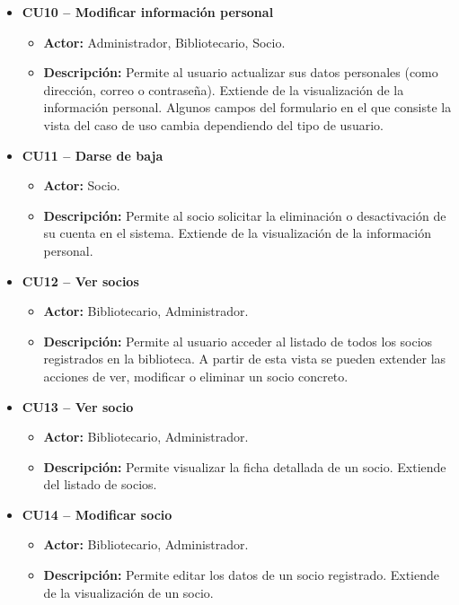 \begin{itemize}
	\item \textbf{CU10 -- Modificar información personal}
	\begin{itemize}
		\item \textbf{Actor:} Administrador, Bibliotecario, Socio.
		\item \textbf{Descripción:} Permite al usuario actualizar sus datos personales (como dirección, correo o contraseña). Extiende de la visualización de la información personal. Algunos campos del formulario en el que consiste la vista del caso de uso cambia dependiendo del tipo de usuario.
	\end{itemize}
	
	\item \textbf{CU11 -- Darse de baja}
	\begin{itemize}
		\item \textbf{Actor:} Socio.
		\item \textbf{Descripción:} Permite al socio solicitar la eliminación o desactivación de su cuenta en el sistema. Extiende de la visualización de la información personal.
	\end{itemize}
	
	\item \textbf{CU12 -- Ver socios}
	\begin{itemize}
		\item \textbf{Actor:} Bibliotecario, Administrador.
		\item \textbf{Descripción:} Permite al usuario acceder al listado de todos los socios registrados en la biblioteca. A partir de esta vista se pueden extender las acciones de ver, modificar o eliminar un socio concreto.
	\end{itemize}
	
	\item \textbf{CU13 -- Ver socio}
	\begin{itemize}
		\item \textbf{Actor:} Bibliotecario, Administrador.
		\item \textbf{Descripción:} Permite visualizar la ficha detallada de un socio. Extiende del listado de socios.
	\end{itemize}
	
	\item \textbf{CU14 -- Modificar socio}
	\begin{itemize}
		\item \textbf{Actor:} Bibliotecario, Administrador.
		\item \textbf{Descripción:} Permite editar los datos de un socio registrado. Extiende de la visualización de un socio.
	\end{itemize}
	

\end{itemize}
